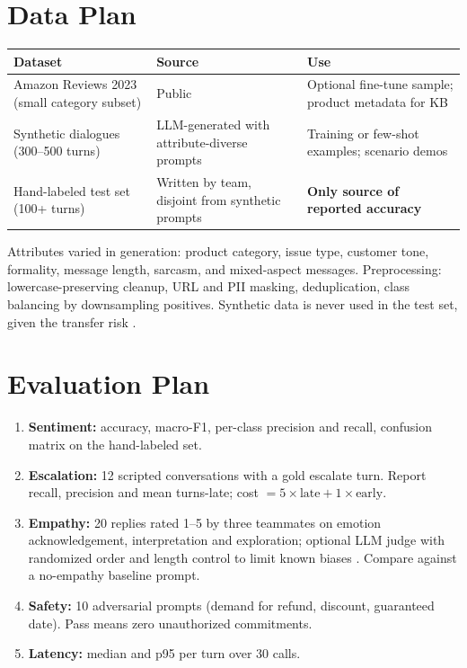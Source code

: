 \documentclass[11pt,a4paper]{article}
\begin{document}
\section{Data Plan}
\begin{center}
\begin{tabular}{@{}p{3.4cm}p{4.3cm}p{6.3cm}@{}}
\toprule
\textbf{Dataset} & \textbf{Source} & \textbf{Use}\\
\midrule
Amazon Reviews 2023 (small category subset) & Public \cite{hou2024} & Optional fine-tune sample; product metadata for KB\\
Synthetic dialogues (300--500 turns) & LLM-generated with attribute-diverse prompts \cite{yu2023} & Training or few-shot examples; scenario demos\\
Hand-labeled test set (100+ turns) & Written by team, disjoint from synthetic prompts & \textbf{Only source of reported accuracy}\\
\bottomrule
\end{tabular}
\end{center}
Attributes varied in generation: product category, issue type, customer tone, formality, message length, sarcasm, and mixed-aspect messages. Preprocessing: lowercase-preserving cleanup, URL and PII masking, deduplication, class balancing by downsampling positives. Synthetic data is never used in the test set, given the transfer risk \cite{li2023synth}.

\section{Evaluation Plan}
\begin{enumerate}
\item \textbf{Sentiment:} accuracy, macro-F1, per-class precision and recall, confusion matrix on the hand-labeled set.
\item \textbf{Escalation:} 12 scripted conversations with a gold escalate turn. Report recall, precision and mean turns-late; cost $=5\times\text{late}+1\times\text{early}$.
\item \textbf{Empathy:} 20 replies rated 1--5 by three teammates on emotion acknowledgement, interpretation and exploration; optional LLM judge with randomized order and length control to limit known biases \cite{zheng2023}. Compare against a no-empathy baseline prompt.
\item \textbf{Safety:} 10 adversarial prompts (demand for refund, discount, guaranteed date). Pass means zero unauthorized commitments.
\item \textbf{Latency:} median and p95 per turn over 30 calls.
\end{enumerate}
\end{document}
